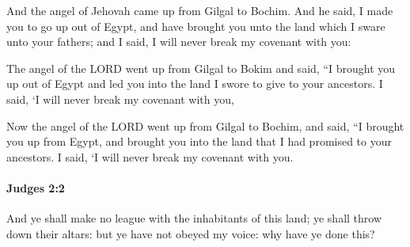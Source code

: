 			\begin{versebox}
					\item[BHS] 
					\item[ASV] And the angel of Jehovah came up from Gilgal to Bochim. And he said, I made you to go up out of Egypt, and have brought you unto the land which I sware unto your fathers; and I said, I will never break my covenant with you:
					\item[NIV] The angel of the LORD went up from Gilgal to Bokim and said, “I brought you up out of Egypt and led you into the land I swore to give to your ancestors. I said, ‘I will never break my covenant with you,
					\item[NRSV] Now the angel of the LORD went up from Gilgal to Bochim, and said, “I brought you up from Egypt, and brought you into the land that I had promised to your ancestors. I said, ‘I will never break my covenant with you.
			\end{versebox}

		\paragraph{Judges 2:2} %
			\label{JUDGES-2-2}

			And ye shall make no league with the inhabitants of this land; ye shall throw down their altars: but ye have not obeyed my voice: why have ye done this?

